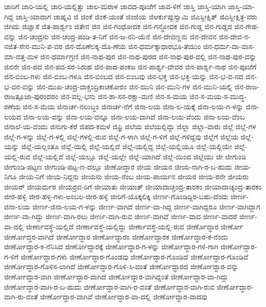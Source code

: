 ಜಾರಿಗೆ
ಜಾರಿ-ಯಲ್ಲಿ
ಜಾರಿ-ಯಲ್ಲಿತ್ತು
ಜಾಲ-ಮರಾಳ
ಜಾವದ-ಪೂಜೆಗೆ
ಜಾವ-ಳಿಗೆ
ಜಾಸ್ತಿ
ಜಾಸ್ತಿ-ಯಾಗಿ
ಜಾಸ್ತಿ-ಯಾ-ಗಿದ್ದ
ಜಾಸ್ತಿ-ಯಾದಾಗ
ಜಾಹ್ನವಿ
ಜಿ
ಜಿಂಕೆ
ಜಿಂಕೆ-ಯಂತೆ
ಜಿಂಜಿಯ
ಜಿಆರ್ಕುಪ್ಪುಸ್ವಾಮಿ
ಜಿಎಸ್ದೀಕ್ಷಿತ್
ಜಿಎಸ್ದೀಕ್ಷಿತ್ರ-ವರು
ಜಿಗಿದು
ಜಿಜ್ಞಾಸೆ
ಜಿತ-ಪಾರ್ಶ್ವಂ
ಜಿತೇನ
ಜಿನ
ಜಿನ-ಗಂಧೋದಕ
ಜಿನ-ಗನ್ಧೋದಕ
ಜಿನ-ಗುಡ್ಡ
ಜಿನ-ಗುಡ್ಡದ
ಜಿನ-ಗೇಹ-ವನ್ನು
ಜಿನ-ಚಂದ್ರನು
ಜಿನ-ಚಂದ್ರ-ಪಂಡಿ-ತ-ನಿಗೆ
ಜಿನ-ಜ-ನನಿ-ಯೆನೆ
ಜಿನ-ದೇವಣ್ಣನು
ಜಿನ-ದೇವನ
ಜಿನ-ದೇವ-ನ-ನಜಿತ-ಸೇನ-ಮುನಿ-ಪ-ವರ
ಜಿನ-ದೊಣೆಲಕ್ಕ-ದೊ-ಣೆಯ
ಜಿನ-ಧರ್ಮಕ್ಕಾಧಾರಭೂ-ತೆಯುಂ
ಜಿನ-ಧರ್ಮ-ದಾ-ವಾಸ-ಮಾ-ದತ್ತ-ಮಳ
ಜಿನ-ಧರ್ಮಾಗ್ರಣಿ
ಜಿನ-ನಾಥ-ಪುರ
ಜಿನ-ನಾಥ-ಪುರದ
ಜಿನ-ನಾಥ-ಪುರ-ದಲ್ಲಿ
ಜಿನ-ನಾಥ-ಪುರ-ವನ್ನು
ಜಿನನೇ
ಜಿನ-ಪದ
ಜಿನ-ಪದ-ಸರ-ಸಿರುಹ
ಜಿನ-ಪಾದ-ಪಂಕಜ
ಜಿನ-ಪಾರ್ಶ್ವ-ದೇವರ
ಜಿನ-ಪಾರ್ಶ್ವ-ನಾಥ
ಜಿನ-ಪೂಜೆಗೆ
ಜಿನ-ಬಿಂಬ-ಗಳು
ಜಿನ-ಬಿಂಬ-ಗಳೂ
ಜಿನ-ಬಿಂಬದ
ಜಿನ-ಬಿಂಬವು
ಜಿನ-ಭಕ್ತ
ಜಿನ-ಭಕ್ತಿ-ಯನ್ನು
ಜಿನ-ಭ-ವ-ನದ
ಜಿನ-ಭ-ವನ-ವನ್ನು
ಜಿನ-ಮುಖ-ಚಂದ್ರ-ವಾಕ್ಚಂದ್ರಿಕಾಚಕೋರಂ
ಜಿನ-ಮುನಿ
ಜಿನ-ಮುನಿ-ಗಳ
ಜಿನ-ಮುನಿ-ಯಲ್ಲಿ
ಜಿನ-ರಾಜ-ರಾಜತ್ಪೂಜಾ-ಪುರಂದರಂ
ಜಿನ-ವಲ್ಲ-ಭನು
ಜಿನ-ಶಾ-ಸನ-ರಕ್ಷಾ-ಮಣಿ
ಜಿನ-ಸ-ಮಯ
ಜಿನ-ಸ-ಮಯ-ಸ-ಮುದ್ಧ-ರಣೆಯ
ಜಿನ-ಸ-ಮೆಯ
ಜಿನಾರ್ಚ-ನಲುಬ್ಧಂ
ಜಿನಾರ್ಚ-ನೆಗೆ
ಜಿನಾ-ಲಯ
ಜಿನಾ-ಲ-ಯಕ್ಕೆ
ಜಿನಾ-ಲಯ-ಗ-ಳನ್ನು
ಜಿನಾ-ಲಯದ
ಜಿನಾ-ಲಯ-ವನ್ನು
ಜಿನಾ-ಲಯ-ವನ್ನೂ
ಜಿನಾ-ಲಯ-ವಾಗಿದೆ
ಜಿನಾ-ಲಯ-ವೆಂದು
ಜಿನಾ-ಲಯ-ವೆಂಬ
ಜಿನಾಲೆ-ಯ-ವೆಂದು
ಜಿನುಗು-ಕೆರೆ
ಜಿಪದ-ಕಮಳೆ
ಜಿಫ್ರಿ
ಜಿಲೆಯ
ಜಿಲೆಯಲ್ಲಿದ್ದು
ಜಿಲ್ಲಾ
ಜಿಲ್ಲಾ-ವಾರು
ಜಿಲ್ಲೆ
ಜಿಲ್ಲೆ-ಗಳ
ಜಿಲ್ಲೆ-ಗ-ಳನ್ನು
ಜಿಲ್ಲೆ-ಗ-ಳಲ್ಲಿ
ಜಿಲ್ಲೆ-ಗಳಲ್ಲಿ-ರುವ
ಜಿಲ್ಲೆ-ಗ-ಳಾಗಿ
ಜಿಲ್ಲೆ-ಗ-ಳಿಗೆ
ಜಿಲ್ಲೆ-ಗಳಿದ್ದವು
ಜಿಲ್ಲೆಗೆ
ಜಿಲ್ಲೆಯ
ಜಿಲ್ಲೆ-ಯನ್ನು
ಜಿಲ್ಲೆ-ಯಲ್ಲಂತೂ
ಜಿಲ್ಲೆ-ಯಲ್ಲಿ
ಜಿಲ್ಲೆ-ಯಲ್ಲಿದೆ
ಜಿಲ್ಲೆ-ಯಲ್ಲಿದ್ದ
ಜಿಲ್ಲೆ-ಯಲ್ಲಿಯೂ
ಜಿಲ್ಲೆ-ಯಲ್ಲಿಯೇ
ಜಿಲ್ಲೆ-ಯಲ್ಲಿ-ರುವ
ಜಿಲ್ಲೆ-ಯಲ್ಲಿವೆ
ಜಿಲ್ಲೆ-ಯಲ್ಲೂ
ಜಿಲ್ಲೆ-ಯಲ್ಲೇ
ಜಿಲ್ಲೆ-ಯಾಗಿದೆ
ಜಿಲ್ಲೆ-ಯಿಂದ
ಜಿಲ್ಲೆಯು
ಜೀ
ಜೀಗುಂಡಿ
ಜೀಗುಂಡಿ-ಪಟ್ಟಣ
ಜೀಗುಂಡಿ-ಪಟ್ಟ-ಣ-ದಲ್ಲೂ
ಜೀಣೋದ್ಧಾರ
ಜೀಯ
ಜೀಯನ
ಜೀಯ-ನಾಗಿ-ರ-ಬ-ಹುದು
ಜೀಯ-ನಿಗೂ
ಜೀಯ-ನಿಗೆ
ಜೀಯ-ನಿದ್ದನು
ಜೀಯನು
ಜೀಯ-ನೆಂಬ
ಜೀಯ-ಪಾರ್ಯನ
ಜೀಯರ
ಜೀಯ-ರನೇ
ಜೀಯರು
ಜೀಯರ್
ಜೀಯರ್ಮಠ
ಜೀಯರ್ರವ-ರಿಗೆ
ಜೀಯಾತು
ಜೀಯಾತ್
ಜೀಯಾದಾಚ್ಚಂದ್ರ-ತಾರಕಂ
ಜೀಯಾದಾಚ್ಯಂದ್ರ-ತಾರಕಂ
ಜೀರ-ಹಳ್ಳಿ
ಜೀರ-ಹಳ್ಳಿ-ಗಳು-ಅಂಬಲ-ಜೀರ-ಹಳ್ಳಿ
ಜೀರಿಗೆ-ಯೊಕ್ಕಲಿಕ್ಕಿ
ಜೀರ್ಣ-ಗೊಂಡಿದ್ದಿರ-ಬಹು-ದೆಂದು
ಜೀರ್ಣ-ಜಿನಾ-ಲಯ
ಜೀರ್ಣ-ಜಿನಾ-ಲಯ-ಗ-ಳನ್ನು
ಜೀರ್ಣ-ವಾಗಿದೆ
ಜೀರ್ಣ-ವಾ-ಗಿದ್ದ
ಜೀರ್ಣ-ವಾಗಿದ್ದರೂ
ಜೀರ್ಣ-ವಾಗಿದ್ದಾಗ
ಜೀರ್ಣ-ವಾ-ಗಿದ್ದು
ಜೀರ್ಣ-ವಾಗಿ-ರಲು
ಜೀರ್ಣ-ವಾಗಿ-ರುವ
ಜೀರ್ಣ-ವಾಗಿವೆ
ಜೀರ್ಣ-ವಾದ
ಜೀರ್ಣ-ವಾದರೆ
ಜೀರ್ಣ-ವಾ-ದಲ್ಲಿ
ಜೀರ್ಣಾವಸ್ಥೆ-ಯಲ್ಲಿದೆ
ಜೀರ್ಣಾವಸ್ಥೆ-ಯಲ್ಲಿದ್ದು
ಜೀರ್ಣಾವಸ್ಥೆ-ಯಲ್ಲಿ-ರುವ
ಜೀರ್ಣೊದ್ಧಾರ
ಜೀರ್ಣೋ
ಜೀರ್ಣೋದ್ಧರ-ವಾಗಿದೆ
ಜೀರ್ಣೋದ್ಧಾರ
ಜೀರ್ಣೋದ್ಧಾರಂ
ಜೀರ್ಣೋದ್ಧಾರಕ
ಜೀರ್ಣೋದ್ಧಾರ-ಕ-ನೆಂದು
ಜೀರ್ಣೋದ್ಧಾರ-ಕ-ನೆನಿಸಿದ
ಜೀರ್ಣೋದ್ಧಾರಕ್ಕೆ
ಜೀರ್ಣೋದ್ಧಾರ-ಗ-ಳನ್ನು
ಜೀರ್ಣೋದ್ಧಾರ-ಗಳಿ-ಗಾಗಿ
ಜೀರ್ಣೋದ್ಧಾರ-ಗ-ಳಿಗೆ
ಜೀರ್ಣೋದ್ಧಾರ-ಗಳು
ಜೀರ್ಣೋದ್ಧಾರ-ಗೊಂಡವು
ಜೀರ್ಣೋದ್ಧಾರ-ಗೊಂಡಿದೆ
ಜೀರ್ಣೋದ್ಧಾರ-ಗೊಂಡಿವೆ
ಜೀರ್ಣೋದ್ಧಾರ-ಗೊಳಿಸ-ಲಾಗಿದೆ
ಜೀರ್ಣೋದ್ಧಾರ-ಗೊಳಿ-ಸಿ-ದಂತೆ
ಜೀರ್ಣೋದ್ಧಾರದ
ಜೀರ್ಣೋದ್ಧಾರ-ವನ್ನು
ಜೀರ್ಣೋದ್ಧಾರ-ವಾಗಿ
ಜೀರ್ಣೋದ್ಧಾರ-ವಾಗಿದೆ
ಜೀರ್ಣೋದ್ಧಾರ-ವಾಗಿದ್ದಂತೆ
ಜೀರ್ಣೋದ್ಧಾರ-ವಾ-ಗಿದ್ದು
ಜೀರ್ಣೋದ್ಧಾರ-ವಾಗಿ-ರ-ಬ-ಹುದು
ಜೀರ್ಣೋದ್ಧಾರ-ವಾಗಿ-ರ-ವಂತೆ
ಜೀರ್ಣೋದ್ಧಾರ-ವಾಗಿ-ರುವ
ಜೀರ್ಣೋದ್ಧಾರ-ವಾಗಿ-ರು-ವಂತೆ
ಜೀರ್ಣೋದ್ಧಾರ-ವಾಗಿವೆ
ಜೀರ್ಣೋದ್ಧಾರ-ವಾ-ದಲ್ಲಿ
ಜೀರ್ಣೋದ್ಧಾರ-ವಾದವು

